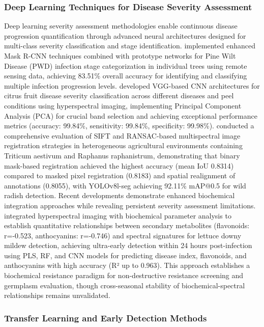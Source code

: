 \documentclass[sn-mathphys]{sn-jnl}
\theoremstyle{thmstyleone}%
\theoremstyle{thmstyletwo}%
\theoremstyle{thmstylethree}%
\begin{document}
\subsubsection{Deep Learning Techniques for Disease Severity Assessment}
Deep learning severity assessment methodologies enable continuous disease progression quantification through advanced neural architectures designed for multi-class severity classification and stage identification. \citet{li2023intelligent} implemented enhanced Mask R-CNN techniques combined with prototype networks for Pine Wilt Disease (PWD) infection stage categorization in individual trees using remote sensing data, achieving 83.51\% overall accuracy for identifying and classifying multiple infection progression levels. \citet{yadav2022citrus} developed VGG-based CNN architectures for citrus fruit disease severity classification across different diseases and peel conditions using hyperspectral imaging, implementing Principal Component Analysis (PCA) for crucial band selection and achieving exceptional performance metrics (accuracy: 99.84\%, sensitivity: 99.84\%, specificity: 99.98\%). \citet{rana2024comprehensive} conducted a comprehensive evaluation of SIFT and RANSAC-based multispectral image registration strategies in heterogeneous agricultural environments containing Triticum aestivum and Raphanus raphanistrum, demonstrating that binary mask-based registration achieved the highest accuracy (mean IoU 0.8314) compared to masked pixel registration (0.8183) and spatial realignment of annotations (0.8055), with YOLOv8l-seg achieving 92.11\% mAP@0.5 for wild radish detection.
Recent developments demonstrate enhanced biochemical integration approaches while revealing persistent severity assessment limitations. \citet{ban2025evaluation} integrated hyperspectral imaging with biochemical parameter analysis to establish quantitative relationships between secondary metabolites (flavonoids: r=-0.523, anthocyanins: r=-0.746) and spectral signatures for lettuce downy mildew detection, achieving ultra-early detection within 24 hours post-infection using PLS, RF, and CNN models for predicting disease index, flavonoids, and anthocyanins with high accuracy (R² up to 0.963). This approach establishes a biochemical resistance paradigm for non-destructive resistance screening and germplasm evaluation, though cross-seasonal stability of biochemical-spectral relationships remains unvalidated.

\subsubsection{Transfer Learning and Early Detection Methods}
\end{document}
